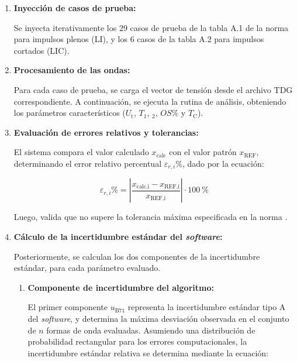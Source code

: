 \begin{enumerate}
    \item \textbf{Inyección de casos de prueba:}
    
    Se inyecta iterativamente los \num{29} casos de prueba de la tabla A.1 de la norma \cite{iec61083_2} para impulsos plenos (LI), y los \num{6} casos de la tabla A.2 para impulsos cortados (LIC).

    \item \textbf{Procesamiento de las ondas:}

    Para cada caso de prueba, se carga el vector de tensión desde el archivo TDG correspondiente. A continuación, se ejecuta la rutina de análisis, obteniendo los parámetros característicos ($U_\text{t}$, $T_1$, $_2$, $OS\%$ y $T_\text{C}$).

    \item \textbf{Evaluación de errores relativos y tolerancias:}
    
    El sistema compara el valor calculado $x_{\text{calc}}$ con el valor patrón $x_{\text{REF}}$, determinando el error relativo percentual $\varepsilon_{r,i}\%$, dado por la ecuación:

    \begin{equation}
        \varepsilon_{r,i}\% = \left| \frac{x_{\text{calc,i}} - x_{\text{REF,i}}}{x_{\text{REF,i}}} \right| \cdot \qty{100}{\percent}
        \label{eq:error_relativo}
    \end{equation}

    Luego, valida que no supere la tolerancia máxima especificada en la norma \cite{iec61083_2}.

    \item \textbf{Cálculo de la incertidumbre estándar del \emph{software}:}
    
    Posteriormente, se calculan los dos componentes de la incertidumbre estándar, para cada parámetro evaluado.

    \begin{enumerate}
        \item \textbf{Componente de incertidumbre del algoritmo:}
        
        El primer componente $u_\text{B71}$ representa la incertidumbre estándar tipo A del \emph{software}, y determina la máxima desviación observada en el conjunto de $n$ formas de onda evaluadas. Asumiendo una distribución de probabilidad rectangular para los errores computacionales, la incertidumbre estándar relativa se determina mediante la ecuación:


\end{enumerate}
\end{enumerate}
